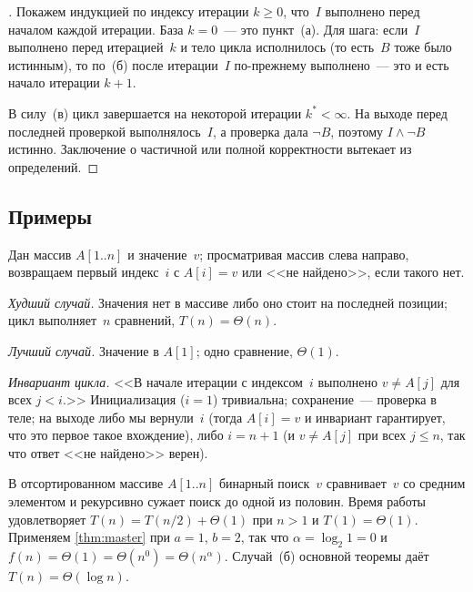 \begin{proof}[]
Покажем индукцией по индексу итерации $k \geq 0$, что~$I$ выполнено
перед началом каждой итерации. База $k = 0$~--- это пункт~(а). Для
шага: если~$I$ выполнено перед итерацией~$k$ и тело цикла исполнилось
(то есть~$B$ тоже было истинным), то по~(б) после итерации~$I$
по-прежнему выполнено~--- это и есть начало итерации $k + 1$.

В силу~(в) цикл завершается на некоторой итерации $k^* < \infty$. На
выходе перед последней проверкой выполнялось~$I$, а проверка дала
$\neg B$, поэтому $I \wedge \neg B$ истинно. Заключение о частичной
или полной корректности вытекает из определений.
\end{proof}

\subsection*{Примеры}

\begin{example}
\label{ex:linear-search}
Дан массив $A[1..n]$ и значение~$v$; просматривая массив слева
направо, возвращаем первый индекс~$i$ с $A[i] = v$ или
<<не найдено>>, если такого нет.

\emph{Худший случай.} Значения нет в массиве либо оно стоит на
последней позиции; цикл выполняет~$n$ сравнений, $T(n) = \Theta(n)$.

\emph{Лучший случай.} Значение в $A[1]$; одно сравнение, $\Theta(1)$.

\emph{Инвариант цикла.} <<В начале итерации с индексом~$i$ выполнено
$v \neq A[j]$ для всех $j < i$.>> Инициализация ($i = 1$) тривиальна;
сохранение~--- проверка в теле; на выходе либо мы вернули~$i$ (тогда
$A[i] = v$ и инвариант гарантирует, что это первое такое вхождение),
либо $i = n + 1$ (и $v \neq A[j]$ при всех $j \leq n$, так что ответ
<<не найдено>> верен).
\end{example}

\begin{example}
\label{ex:binary-search}
В отсортированном массиве $A[1..n]$ бинарный поиск~$v$ сравнивает~$v$
со средним элементом и рекурсивно сужает поиск до одной из половин.
Время работы удовлетворяет $T(n) = T(n/2) + \Theta(1)$ при $n > 1$ и
$T(1) = \Theta(1)$. Применяем \cref{thm:master} при $a = 1$, $b = 2$,
так что $\alpha = \log_2 1 = 0$ и
$f(n) = \Theta(1) = \Theta(n^0) = \Theta(n^\alpha)$. Случай~(б)
основной теоремы даёт $T(n) = \Theta(\log n)$.
\end{example}

